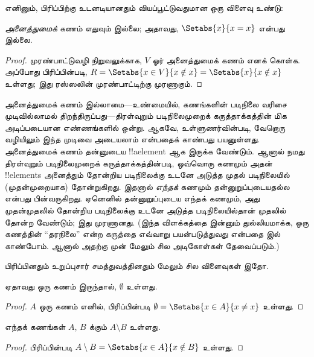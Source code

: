 \documentclass[../../../include/open-logic-section]{subfiles}
\begin{document}
எனினும், பிரிப்பிற்கு உடனடியானதும் வியப்பூட்டுவதுமான ஒரு விளைவு உண்டு:

\begin{thm}
\emph{அனைத்துமைக்} கணம் எதுவும் இல்லை; அதாவது,
$\Setabs{x}{x = x}$ என்பது இல்லை.
\end{thm}

\begin{proof}
முரண்பாட்டுவழி நிறுவலுக்காக, $V$ ஓர் அனைத்துமைக் கணம் எனக் கொள்க.
அப்போது பிரிப்பின்படி,
$R = \Setabs{x \in V}{x \notin x} = \Setabs{x}{x \notin x}$ உள்ளது;
இது ரஸ்ஸலின் முரண்பாட்டிற்கு முரணாகும்.
\end{proof}

அனைத்துமைக் கணம் இல்லாமை---உண்மையில், கணங்களின் படிநிலை வரிசை
முடிவில்லாமல் திறந்திருப்பது---திரள்வுறும் படிநிலைமுறைக் கருத்தாக்கத்தின்
மிக அடிப்படையான எண்ணங்களில் ஒன்று. ஆகவே, உள்ளுணர்வின்படி, வேறொரு வழியிலும்
இந்த முடிவை அடையலாம் என்பதைக் காண்பது பயனுள்ளது. அனைத்துமைக் கணம் தன்னுடைய
!!a{element} ஆக இருக்க வேண்டும். ஆனால் நமது திரள்வுறும் படிநிலைமுறைக்
கருத்தாக்கத்தின்படி, ஒவ்வொரு கணமும் அதன் !!{element}s அனைத்தும் தோன்றிய
படிநிலைக்கு உடனே அடுத்த முதல் படிநிலையில் (முதன்முறையாக) தோன்றுகிறது.
இதனால் \emph{எந்தக்} கணமும் தன்னுறுப்புடையதல்ல என்பது பின்வருகிறது.
ஏனெனில் தன்னுறுப்புடைய எந்தக் கணமும், அது முதன்முதலில் தோன்றிய
படிநிலைக்கு உடனே அடுத்த படிநிலையில்தான் முதலில் தோன்ற வேண்டும்; இது
முரணானது. (இந்த விளக்கத்தை இன்னும் துல்லியமாக்க, ஒரு கணத்தின் ``தரநிலை''
என்ற கருத்தை எவ்வாறு பயன்படுத்துவது என்பதை
 இல் காண்போம். ஆனால் அதற்கு முன்
மேலும் சில அடிகோள்கள் தேவைப்படும்.)

பிரிப்பினதும் உறுப்புசார் சமத்துவத்தினதும் மேலும் சில விளைவுகள் இதோ.

\begin{prop}
ஏதாவது ஒரு கணம் இருந்தால், $\emptyset$ உள்ளது.
\end{prop}

\begin{proof}
$A$ ஒரு கணம் எனில், பிரிப்பின்படி
$\emptyset = \Setabs{x \in A}{x \neq x}$ உள்ளது.
\end{proof}

\begin{prop}
எந்தக் கணங்கள் $A$, $B$ க்கும் $A \setminus B$ உள்ளது.
\end{prop}

\begin{proof}
பிரிப்பின்படி $A \setminus B = \Setabs{x \in A}{x \notin B}$ உள்ளது.
\end{proof}
\end{document}

